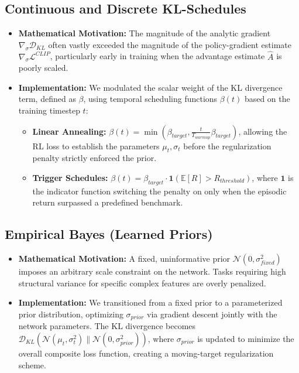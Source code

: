 \documentclass[11pt,a4paper]{article}
\begin{document}
\subsection{Continuous and Discrete KL-Schedules}
\begin{itemize}
    \item \textbf{Mathematical Motivation:} The magnitude of the analytic gradient $\nabla_\sigma \mathcal{D}_{KL}$ often vastly exceeded the magnitude of the policy-gradient estimate $\nabla_\sigma \mathcal{L}^{CLIP}$, particularly early in training when the advantage estimate $\hat{A}$ is poorly scaled. 
    \item \textbf{Implementation:} We modulated the scalar weight of the KL divergence term, defined as $\beta$, using temporal scheduling functions $\beta(t)$ based on the training timestep $t$:
    \begin{itemize}
        \item \textbf{Linear Annealing:} $\beta(t) = \min(\beta_{target}, \frac{t}{T_{warmup}} \beta_{target})$, allowing the RL loss to establish the parameters $\mu_t, \sigma_t$ before the regularization penalty strictly enforced the prior.
        \item \textbf{Trigger Schedules:} $\beta(t) = \beta_{target} \cdot \mathbf{1}(\mathbb{E}[R] > R_{threshold})$, where $\mathbf{1}$ is the indicator function switching the penalty on only when the episodic return surpassed a predefined benchmark.
    \end{itemize}
\end{itemize}

\subsection{Empirical Bayes (Learned Priors)}
\begin{itemize}
    \item \textbf{Mathematical Motivation:} A fixed, uninformative prior $\mathcal{N}(0, \sigma_{fixed}^2)$ imposes an arbitrary scale constraint on the network. Tasks requiring high structural variance for specific complex features are overly penalized.
    \item \textbf{Implementation:} We transitioned from a fixed prior to a parameterized prior distribution, optimizing $\sigma_{prior}$ via gradient descent jointly with the network parameters. The KL divergence becomes $\mathcal{D}_{KL}( \mathcal{N}(\mu_t, \sigma_t^2) \| \mathcal{N}(0, \sigma_{prior}^2) )$, where $\sigma_{prior}$ is updated to minimize the overall composite loss function, creating a moving-target regularization scheme.
\end{itemize}
\end{document}
